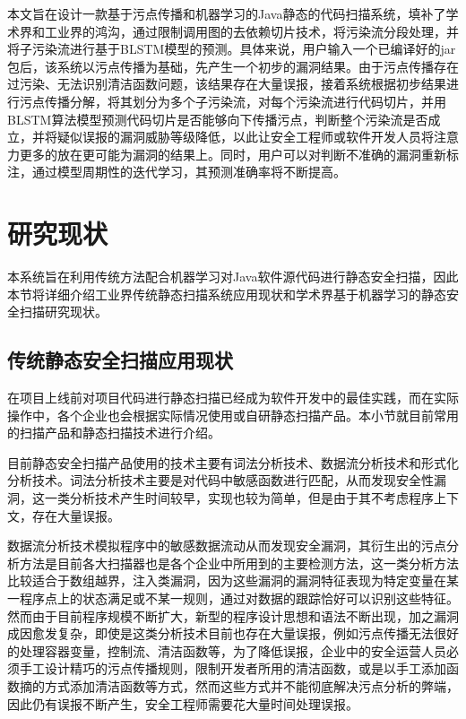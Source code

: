 本文旨在设计一款基于污点传播和机器学习的Java静态的代码扫描系统，填补了学术界和工业界的鸿沟，通过限制调用图的去依赖切片技术，将污染流分段处理，并将子污染流进行基于BLSTM模型的预测。具体来说，用户输入一个已编译好的jar包后，该系统以污点传播为基础，先产生一个初步的漏洞结果。由于污点传播存在过污染、无法识别清洁函数问题，该结果存在大量误报，接着系统根据初步结果进行污点传播分解，将其划分为多个子污染流，对每个污染流进行代码切片，并用BLSTM算法模型预测代码切片是否能够向下传播污点，判断整个污染流是否成立，并将疑似误报的漏洞威胁等级降低，以此让安全工程师或软件开发人员将注意力更多的放在更可能为漏洞的结果上。同时，用户可以对判断不准确的漏洞重新标注，通过模型周期性的迭代学习，其预测准确率将不断提高。

\section{研究现状}
本系统旨在利用传统方法配合机器学习对Java软件源代码进行静态安全扫描，因此本节将详细介绍工业界传统静态扫描系统应用现状和学术界基于机器学习的静态安全扫描研究现状。\\

\subsection{传统静态安全扫描应用现状}

在项目上线前对项目代码进行静态扫描已经成为软件开发中的最佳实践，而在实际操作中，各个企业也会根据实际情况使用或自研静态扫描产品。本小节就目前常用的扫描产品和静态扫描技术进行介绍。

目前静态安全扫描产品使用的技术主要有词法分析技术、数据流分析技术和形式化分析技术。词法分析技术主要是对代码中敏感函数进行匹配，从而发现安全性漏洞，这一类分析技术产生时间较早，实现也较为简单，但是由于其不考虑程序上下文，存在大量误报。

数据流分析技术模拟程序中的敏感数据流动从而发现安全漏洞，其衍生出的污点分析方法是目前各大扫描器也是各个企业中所用到的主要检测方法，这一类分析方法比较适合于数组越界，注入类漏洞，因为这些漏洞的漏洞特征表现为特定变量在某一程序点上的状态满足或不某一规则，通过对数据的跟踪恰好可以识别这些特征。然而由于目前程序规模不断扩大，新型的程序设计思想和语法不断出现，加之漏洞成因愈发复杂，即使是这类分析技术目前也存在大量误报，例如污点传播无法很好的处理容器变量，控制流、清洁函数等，为了降低误报，企业中的安全运营人员必须手工设计精巧的污点传播规则，限制开发者所用的清洁函数，或是以手工添加函数摘的方式添加清洁函数等方式，然而这些方式并不能彻底解决污点分析的弊端，因此仍有误报不断产生，安全工程师需要花大量时间处理误报。

